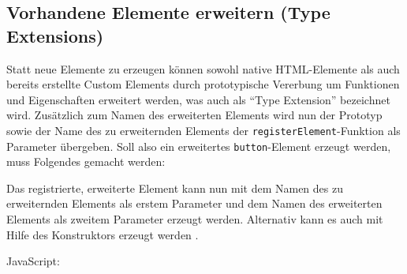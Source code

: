 \begin{Shaded}
\begin{Highlighting}[]
\NormalTok{\}}
\end{Highlighting}
\end{Shaded}


\subsection{Vorhandene Elemente erweitern (Type Extensions)}\label{vorhandene-elemente-erweitern-type-extensions}

Statt neue Elemente zu erzeugen können sowohl native HTML-Elemente als auch bereits erstellte Custom Elements durch prototypische Vererbung um Funktionen und Eigenschaften erweitert werden, was auch als ``Type Extension'' bezeichnet wird. Zusätzlich zum Namen des erweiterten Elements wird nun der Prototyp sowie der Name des zu erweiternden Elements der \texttt{registerElement}-Funktion als Parameter übergeben. Soll also ein erweitertes \texttt{button}-Element erzeugt werden, muss Folgendes gemacht werden:

\begin{Shaded}
\begin{Highlighting}[]
 \OperatorTok{=} \NormalTok{(}\OperatorTok{,} \OperatorTok{\{}
  \OperatorTok{:} \NormalTok{(}\NormalTok{)}\OperatorTok{,}
  \OperatorTok{:} 
\OperatorTok{\}}\NormalTok{)}\OperatorTok{;}
\end{Highlighting}
\end{Shaded}

Das registrierte, erweiterte Element kann nun mit dem Namen des zu erweiternden Elements als erstem Parameter und dem Namen des erweiterten Elements als zweitem Parameter erzeugt werden. Alternativ kann es auch mit Hilfe des Konstruktors erzeugt werden \cite{citeulike:13752379}.


JavaScript:
\begin{Shaded}
\begin{Highlighting}[]
 \OperatorTok{=} \NormalTok{(}\OperatorTok{,} \NormalTok{)}\OperatorTok{;}

 \OperatorTok{=}  \NormalTok{()}\OperatorTok{;}
\end{Highlighting}
\end{Shaded}

